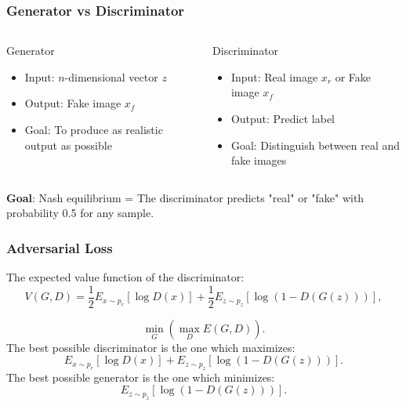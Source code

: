 \begin{frame}
\frametitle{Generator vs Discriminator}
\begin{columns}
	\begin{block}{Generator}
		\begin{itemize}
			\item Input: $n$-dimensional vector $z$
			\item Output: Fake image $x_f$
			\item Goal: To produce as realistic output as possible
		\end{itemize}
	\end{block}
	\begin{block}{Discriminator}
		\begin{itemize}
 			\item Input: Real image $x_r$ or Fake image $x_f$
 			\item Output: Predict label
 			\item Goal: Distinguish between real and fake images
		\end{itemize}
	\end{block}
\end{columns}
\vspace{1.3cm}
\centering
\textbf{Goal}: Nash equilibrium = The discriminator predicts "real" or "fake" with probability 0.5 for any sample.
\end{frame}

\begin{frame}
\frametitle{Adversarial Loss}
The expected value function of the discriminator:
\begin{equation} \label{Adversarial_loss}
V(G,D) = \frac{1}{2}E_{x\sim p_r}[\log D(x)]+\frac{1}{2}E_{z\sim p_z}[\log (1-D(G(z)))],
\end{equation}

\begin{equation}
\min_G(\max_D E(G,D)).
\end{equation} 
The best possible discriminator is the one which maximizes:
\begin{equation}
E_{x\sim p_r}[\log D(x)]+E_{z\sim p_z}[\log (1-D(G(z)))].
\end{equation}
The best possible generator is the one which minimizes:
\begin{equation}
E_{z\sim p_z}[\log (1-D(G(z)))].
\end{equation}
\end{frame}

